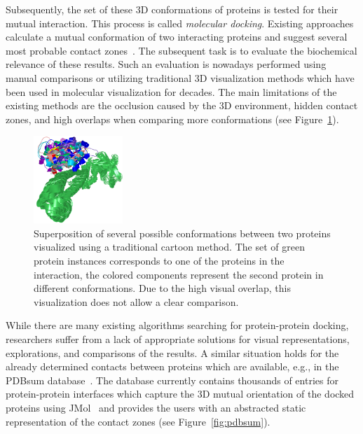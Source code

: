 \documentclass[11pt,a4paper,titlepage,oneside,onecolumn]{article}
\begin{document}
Subsequently, the set of these 3D conformations of proteins is tested for their mutual interaction. 
This process is called \textit{molecular docking}. 
Existing approaches calculate a mutual conformation of two interacting proteins and suggest several most probable contact zones~\cite{huang}. 
The subsequent task is to evaluate the biochemical relevance of these results. 
Such an evaluation is nowadays performed using manual comparisons or utilizing traditional 3D visualization methods which have been used in molecular visualization for decades.
The main limitations of the existing methods are the occlusion caused by the 3D environment, hidden contact zones, and high overlaps when comparing more conformations (see Figure~\ref{fig:problem}).

\begin{figure}[ht]
\centering
\includegraphics[width=0.3\textwidth]{pics/problem.png}
\caption{Superposition of several possible conformations between two proteins visualized using a traditional cartoon method. The set of green protein instances corresponds to one of the proteins in the interaction, the colored components represent the second protein in different conformations. Due to the high visual overlap, this visualization does not allow a clear comparison.}
\label{fig:problem}
\end{figure}

While there are many existing algorithms searching for protein-protein docking, researchers suffer from a lack of appropriate solutions for visual representations, explorations, and comparisons of the results. 
A similar situation holds for the already determined contacts between proteins which are available, e.g., in the PDBsum database~\cite{pdbsum}.
The database currently contains thousands of entries for protein-protein interfaces which capture the 3D mutual orientation of the docked proteins using JMol~\cite{jmol} and provides the users with an abstracted static representation of the contact zones (see Figure~\ref{fig:pdbsum}).
\end{document}
